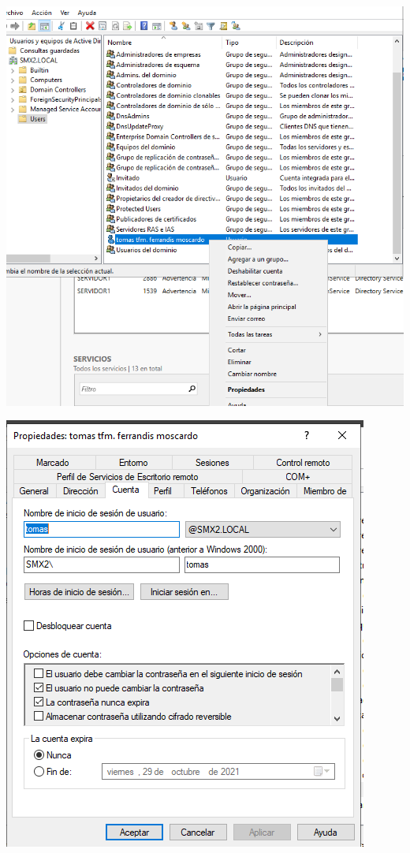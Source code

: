 \documentclass[
  a4paper,
]{article}
\begin{document}
\includegraphics{png/usuaris6.png}

\includegraphics{png/usuaris7.png}
\end{document}
